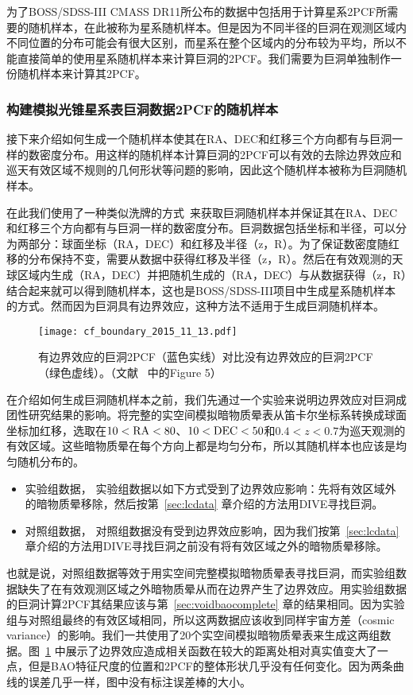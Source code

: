 {为了BOSS/SDSS-III CMASS DR11所公布的数据中包括用于计算星系2PCF所需要的随机样本，在此被称为星系随机样本。但是因为不同半径的巨洞在观测区域内不同位置的分布可能会有很大区别，而星系在整个区域内的分布较为平均，所以不能直接简单的使用星系随机样本来计算巨洞的2PCF。我们需要为巨洞单独制作一份随机样本来计算其2PCF。

\subsubsection{构建模拟光锥星系表巨洞数据2PCF的随机样本}
\label{sec:lcrandom}

接下来介绍如何生成一个随机样本使其在RA、DEC和红移三个方向都有与巨洞一样的数密度分布。用这样的随机样本计算巨洞的2PCF可以有效的去除边界效应和巡天有效区域不规则的几何形状等问题的影响，因此这个随机样本被称为巨洞随机样本。

在此我们使用了一种类似洗牌的方式~\cite{Anderson2014441}来获取巨洞随机样本并保证其在RA、DEC和红移三个方向都有与巨洞一样的数密度分布。巨洞数据包括坐标和半径，可以分为两部分：球面坐标（RA，DEC）和红移及半径（z，R）。为了保证数密度随红移的分布保持不变，需要从数据中获得红移及半径（z，R）。然后在有效观测的天球区域内生成（RA，DEC）并把随机生成的（RA，DEC）与从数据获得（z，R）结合起来就可以得到随机样本，这也是BOSS/SDSS-III项目中生成星系随机样本的方式。然而因为巨洞具有边界效应，这种方法不适用于生成巨洞随机样本。

\begin{figure}
\centering
\texttt{[image: cf\_boundary\_2015\_11\_13.pdf]}
\caption{有边界效应的巨洞2PCF（蓝色实线）对比没有边界效应的巨洞2PCF（绿色虚线）。（文献 ~中的Figure 5）}
\label{fig:cf_boundary}
\end{figure}

在介绍如何生成巨洞随机样本之前，我们先通过一个实验来说明边界效应对巨洞成团性研究结果的影响。将完整的实空间模拟暗物质晕表从笛卡尔坐标系转换成球面坐标加红移，选取在$10<{\rm RA}<80$、$10<{\rm DEC}<50$和$0.4<z<0.7$为巡天观测的有效区域。这些暗物质晕在每个方向上都是均匀分布，所以其随机样本也应该是均匀随机分布的。
\begin{itemize}
\item 实验组数据， 实验组数据以如下方式受到了边界效应影响：先将有效区域外的暗物质晕移除，然后按第~\ref{sec:lcdata} 章介绍的方法用DIVE寻找巨洞。
\item 对照组数据， 对照组数据没有受到边界效应影响，因为我们按第~\ref{sec:lcdata} 章介绍的方法用DIVE寻找巨洞之前没有将有效区域之外的暗物质晕移除。
\end{itemize}
也就是说，对照组数据等效于用实空间完整模拟暗物质晕表寻找巨洞，而实验组数据缺失了在有效观测区域之外暗物质晕从而在边界产生了边界效应。用实验组数据的巨洞计算2PCF其结果应该与第~\ref{sec:voidbaocomplete} 章的结果相同。因为实验组与对照组最终的有效区域相同，所以这两数据应该收到同样宇宙方差（cosmic variance）的影响。我们一共使用了20个实空间模拟暗物质晕表来生成这两组数据。图~\ref{fig:cf_boundary} 中展示了边界效应造成相关函数在较大的距离处相对真实值变大了一点，但是BAO特征尺度的位置和2PCF的整体形状几乎没有任何变化。因为两条曲线的误差几乎一样，图中没有标注误差棒的大小。

}

